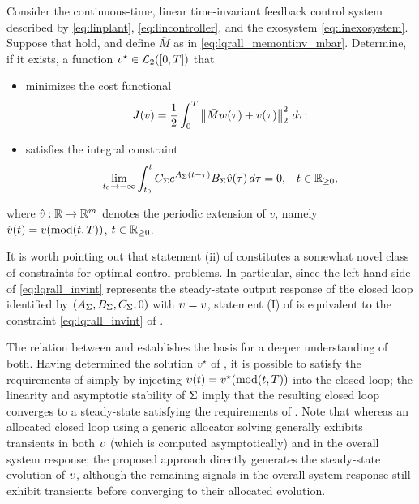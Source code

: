 \begin{problem}
	\label{prb:lqrall_optcont}
	Consider the continuous-time, linear time-invariant feedback control system described by \eqref{eq:linplant}, \eqref{eq:lincontroller}, and the exosystem \eqref{eq:linexosystem}. Suppose that  hold, and define $\bar{M}$ as in \eqref{eq:lqrall_memontinv_mbar}.
	Determine, if it exists, a function $v^{\star}\in\mathcal{L}_2([0,T])$ that
	\begin{itemize}
		\item[(i)] minimizes the cost functional
		  \begin{equation}
			  \label{eq:lqrall_optcontcost}
			  J(v) = \frac{1}{2} \int_{0}^{T} \left\Vert \bar{M}w(\tau) + v(\tau) \right\Vert^2_2\,d\tau;
		  \end{equation}
		\item[(ii)] satisfies the integral constraint
	    \begin{align}
	      \label{eq:lqrall_invint}
	      \lim_{t_0 \to -\infty} \int_{t_0}^{t} C_\Sigma e^{{A_\Sigma}(t - \tau)} B_\Sigma \hat{v}(\tau)\,d\tau &= 0, & t\in\mathbb{R}_{\geq 0},
	    \end{align}
	\end{itemize}
	where $\hat{v} : \mathbb{R} \rightarrow \mathbb{R}^m$ denotes the periodic extension of $v$, namely $\hat{v}(t) = v(\operatorname{mod}(t, T))$, $t\in\mathbb{R}_{\geq 0}$.\closestatement
\end{problem}

It is worth pointing out that statement (ii) of  constitutes a somewhat novel class of constraints for optimal control problems. In particular, since the left-hand side of \eqref{eq:lqrall_invint} represents the steady-state output response of the closed loop identified by $(A_\Sigma,B_\Sigma,C_\Sigma,0)$ with $\upsilon = v$, statement (I) of  is equivalent to the constraint \eqref{eq:lqrall_invint} of .

\begin{remark}
  \label{rem:lqrall_apply}
  The relation between  and  establishes the basis for a deeper understanding of both. Having determined the solution $v^{\star}$ of , it is possible to satisfy the requirements of  simply by injecting $\upsilon(t)=v^{\star}(\operatorname{mod}(t,T))$ into the closed loop; the linearity and asymptotic stability of $\Sigma$ imply that the resulting closed loop converges to a steady-state satisfying the requirements of . Note that whereas an allocated closed loop using a generic allocator solving  generally exhibits transients in both $\upsilon$ (which is computed asymptotically) and in the overall system response; the proposed approach directly generates the steady-state evolution of $\upsilon$, although the remaining signals in the overall system response still exhibit transients before converging to their allocated evolution.\closeremark
\end{remark}

